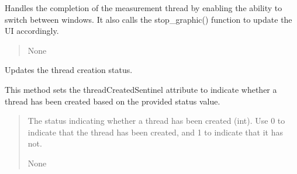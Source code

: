 \documentclass[letterpaper,10pt,english]{sphinxmanual}
\begin{document}
\begin{fulllineitems}
\begin{fulllineitems}
\begin{quote}
\begin{description}
\end{description}\end{quote}

\end{fulllineitems}


\begin{fulllineitems}
\label{\detokenize{StartStopHist:StartStopHist.StartStopLogic.threadComplete}}
\pysigstartsignatures
{}
\pysigstopsignatures
\sphinxAtStartPar
Handles the completion of the measurement thread by enabling the ability to switch between windows. 
It also calls the stop\_graphic() function to update the UI accordingly.
\begin{quote}\begin{description}
\sphinxAtStartPar
None

\end{description}\end{quote}

\end{fulllineitems}


\begin{fulllineitems}
\label{\detokenize{StartStopHist:StartStopHist.StartStopLogic.threadRunning}}
\pysigstartsignatures
{}
\pysigstopsignatures
\sphinxAtStartPar
Updates the thread creation status.

\sphinxAtStartPar
This method sets the threadCreatedSentinel attribute to indicate whether a thread has been created 
based on the provided status value.
\begin{quote}\begin{description}
\sphinxAtStartPar
{} \textendash{} The status indicating whether a thread has been created (int). 
Use 0 to indicate that the thread has been created, and 1 to indicate that it has not.

\sphinxAtStartPar
None

\end{description}\end{quote}


\end{fulllineitems}
\end{fulllineitems}
\end{document}

